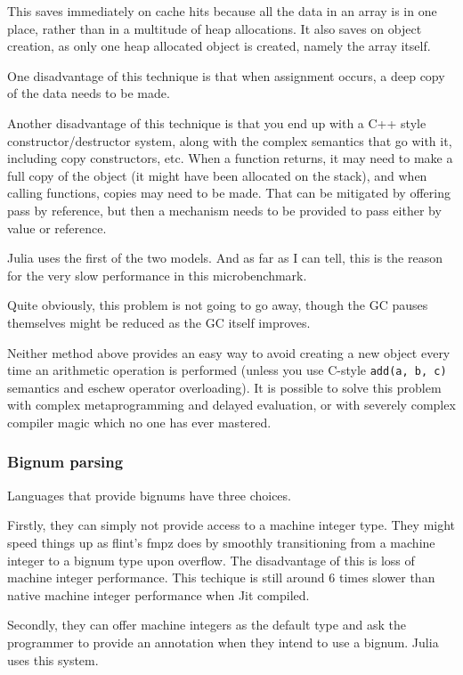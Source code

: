 \documentclass[a4paper,10pt]{article}
\newcommand{\code}{\lstinline}
\begin{document}
This saves immediately on cache hits because all the data in an array is in one place, rather than
in a multitude of heap allocations. It also saves on object creation, as only one heap allocated
object is created, namely the array itself.

One disadvantage of this technique is that when assignment occurs, a deep copy of the data needs to
be made.

Another disadvantage of this technique is that you end up with a C++ style constructor/destructor
system, along with the complex semantics that go with it, including copy constructors, etc. When
a function returns, it may need to make a full copy of the object (it might have been allocated
on the stack), and when calling functions, copies may need to be made. That can be mitigated by
offering pass by reference, but then a mechanism needs to be provided to pass either by value or
reference.

Julia uses the first of the two models. And as far as I can tell, this is the reason for the very
slow performance in this microbenchmark.

Quite obviously, this problem is not going to go away, though the GC pauses themselves might be
reduced as the GC itself improves.

Neither method above provides an easy way to avoid creating a new object every time an arithmetic 
operation is performed (unless you use C-style \code{add(a, b, c)} semantics and eschew operator
overloading). It is possible to solve this problem with complex metaprogramming and delayed
evaluation, or with severely complex compiler magic which no one has ever mastered.

\subsubsection{Bignum parsing}

Languages that provide bignums have three choices.

Firstly, they can simply not provide access to a machine integer type. They might speed things up
as flint's fmpz does by smoothly transitioning from a machine integer to a bignum type upon
overflow. The disadvantage of this is loss of machine integer performance. This techique is still
around 6 times slower than native machine integer performance when Jit compiled.

Secondly, they can offer machine integers as the default type and ask the programmer to provide an
annotation when they intend to use a bignum. Julia uses this system.
\end{document}
